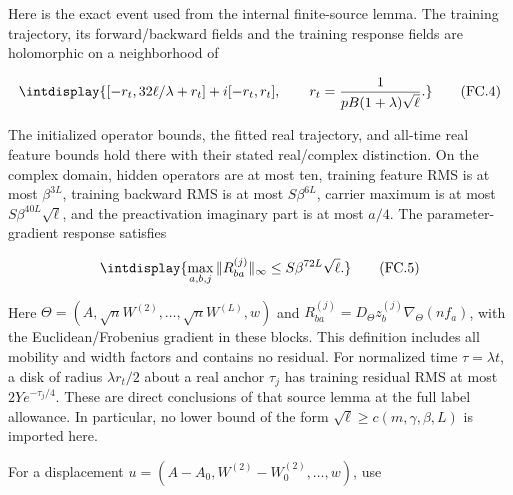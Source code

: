 
Here is the exact event used from the internal finite-source lemma. The training trajectory, its forward/backward fields and the training response fields are holomorphic on a neighborhood of


\begingroup\renewcommand{\theHequation}{intdisplay.695}
\begin{equation}
\intdisplay{
[-r_t,32\ell/\lambda+r_t]+i[-r_t,r_t],\qquad
r_t=\frac1{pB(1+\lambda)\sqrt\ell}.
}
\tag{FC.4}
\label{int:eq-0309-fc-4}
\end{equation}
\endgroup


The initialized operator bounds, the fitted real trajectory, and all-time real feature bounds hold there with their stated real/complex distinction. On the complex domain, hidden operators are at most ten, training feature RMS is at most \(\beta^{3L}\), training backward RMS is at most \(S\beta^{6L}\), carrier maximum is at most \(S\beta^{40L}\sqrt\ell\), and the preactivation imaginary part is at most \(a/4\). The parameter-gradient response satisfies


\begingroup\renewcommand{\theHequation}{intdisplay.696}
\begin{equation}
\intdisplay{
\max_{a,b,j}\|R_{ba}^{(j)}\|_\infty
\le S\beta^{72L}\sqrt\ell.
}
\tag{FC.5}
\label{int:eq-0310-fc-5}
\end{equation}
\endgroup


Here \(\Theta=(A,\allowbreak \sqrt nW^{(2)},\allowbreak \ldots,\allowbreak \sqrt nW^{(L)},\allowbreak w)\) and \(R_{ba}^{(j)}=D_\Theta z_b^{(j)}\nabla_\Theta(nf_a)\), with the Euclidean/\allowbreak Frobenius gradient in these blocks. This definition includes all mobility and width factors and contains no residual. For normalized time \(\tau=\lambda t\), a disk of radius \(\lambda r_t/2\) about a real anchor \(\tau_j\) has training residual RMS at most \(2Y e^{-\tau_j/4}\). These are direct conclusions of that source lemma at the full label allowance. In particular, no lower bound of the form \(\sqrt\ell\ge c(m,\allowbreak \gamma,\allowbreak \beta,\allowbreak L)\) is imported here.



For a displacement \(u=(A-A_0,\allowbreak W^{(2)}-W_0^{(2)},\allowbreak \ldots,\allowbreak w)\), use


